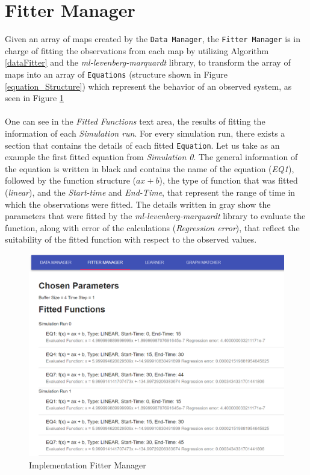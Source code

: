 \newpage

\section{Fitter Manager}
Given an array of maps created by the \texttt{Data Manager}, the \texttt{Fitter Manager} is in charge of fitting the observations from each map by utilizing Algorithm \ref{dataFitter} and the \textit{ml-levenberg-marquardt} library, to transform the array of maps into an array of \texttt{Equations} (structure shown in Figure \ref{equation_Structure}) which represent the behavior of an observed system, as seen in Figure \ref{fitter_manager} \\ \\
%
One can see in the \textit{Fitted Functions} text area, the results of fitting the information of each \textit{Simulation run}.
%
For every simulation run, there exists a section that contains the details of each fitted \texttt{Equation}. Let us take as an example the first fitted equation from \textit{Simulation 0}. The general information of the equation is written in black and contains the name of the equation (\textit{EQ1}), followed by the function structure ($ax+b$), the type of function that was fitted (\textit{linear}), and the \textit{Start-time} and \textit{End-Time}, that represent the range of time in which the observations were fitted. The details written in gray show the parameters that were fitted by the \textit{ml-levenberg-marquardt} library to evaluate the function, along with error of the calculations (\textit{Regression error}), that reflect the suitability of the fitted function with respect to the observed values.  
\begin{figure}[h]
	\centering
	\includegraphics[scale=0.5]{./pictures/implementation/fitter_manager.png}
	\caption{Implementation Fitter Manager }
	\label{fitter_manager}
\end{figure}
